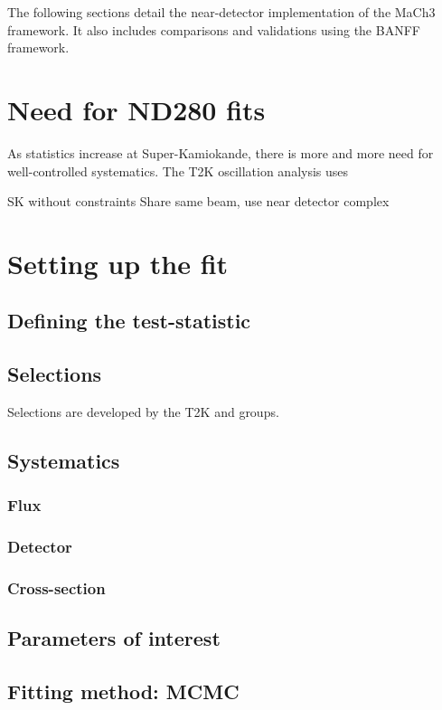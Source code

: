 The following sections detail the near-detector implementation of the MaCh3 framework. It also includes comparisons and validations using the BANFF framework.

\section{Need for ND280 fits}
As statistics increase at Super-Kamiokande, there is more and more need for well-controlled systematics. The T2K oscillation analysis uses 

SK without constraints
Share same beam, use near detector complex

\section{Setting up the fit}

\subsection{Defining the test-statistic}

\subsection{Selections}
\label{subsec:ND280:sel}
Selections are developed by the T2K \numu and \nue groups.

\subsection{Systematics}
\label{subsec:ND280:syst}
\subsubsection{Flux}
\subsubsection{Detector}
\subsubsection{Cross-section}

\subsection{Parameters of interest}

\subsection{Fitting method: MCMC}

